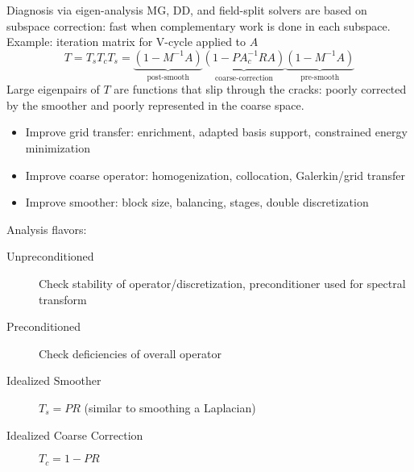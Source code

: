 \documentclass[final,t]{beamer}
\begin{document}
\begin{frame}[fragile]{}
\begin{columns}
\begin{column}{0.49\textwidth}
      \vspace{-2em}
      \begin{block}{Diagnosis via eigen-analysis}
        MG, DD, and field-split solvers are based on subspace correction: fast when complementary work is done in each subspace.
        Example: iteration matrix for V-cycle applied to $A$
        \begin{equation*}
          T = T_s T_c T_s = \underbrace{(1 - M^{-1}A)}_{\text{post-smooth}} \underbrace{(1 - P A_c^{-1}R A)}_{\text{coarse-correction}} \underbrace{(1 - M^{-1}A)}_{\text{pre-smooth}}
        \end{equation*}
        Large eigenpairs of $T$ are functions that slip through the cracks: poorly corrected by the smoother and poorly represented in the coarse space.
        \begin{itemize}
        \item Improve grid transfer: enrichment, adapted basis support, constrained energy minimization
        \item Improve coarse operator: homogenization, collocation, Galerkin/grid transfer
        \item Improve smoother: block size, balancing, stages, double discretization
        \end{itemize}
        Analysis flavors:
        \begin{description}
        \item[Unpreconditioned] Check stability of operator/discretization, preconditioner used for spectral transform
        \item[Preconditioned] Check deficiencies of overall operator
        \item[Idealized Smoother] $T_s = PR$ (similar to smoothing a Laplacian)
        \item[Idealized Coarse Correction] $T_c = 1 - PR$
        \end{description}
      \end{block}


\end{column}
\end{columns}
\end{frame}
\end{document}
